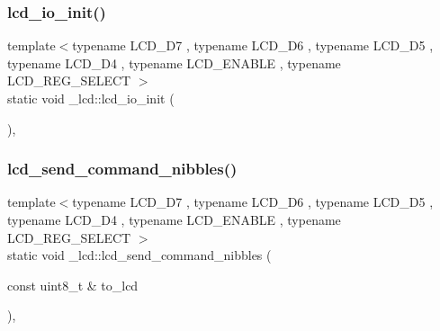 \subsubsection{\texorpdfstring{lcd\+\_\+io\+\_\+init()}{lcd\_io\_init()}}
{\footnotesize\ttfamily template$<$typename L\+C\+D\+\_\+\+D7 , typename L\+C\+D\+\_\+\+D6 , typename L\+C\+D\+\_\+\+D5 , typename L\+C\+D\+\_\+\+D4 , typename L\+C\+D\+\_\+\+E\+N\+A\+B\+LE , typename L\+C\+D\+\_\+\+R\+E\+G\+\_\+\+S\+E\+L\+E\+CT $>$ \\
static void \+\_\+lcd\+::lcd\+\_\+io\+\_\+init (\begin{DoxyParamCaption}{ }\end{DoxyParamCaption})\hspace{0.3cm}{\ttfamily [inline]}, {\ttfamily [static]}}

\hypertarget{namespace__lcd_a19b7494e20f4704c3272876e70acf095}{}\label{namespace__lcd_a19b7494e20f4704c3272876e70acf095} 
\subsubsection{\texorpdfstring{lcd\+\_\+send\+\_\+command\+\_\+nibbles()}{lcd\_send\_command\_nibbles()}}
{\footnotesize\ttfamily template$<$typename L\+C\+D\+\_\+\+D7 , typename L\+C\+D\+\_\+\+D6 , typename L\+C\+D\+\_\+\+D5 , typename L\+C\+D\+\_\+\+D4 , typename L\+C\+D\+\_\+\+E\+N\+A\+B\+LE , typename L\+C\+D\+\_\+\+R\+E\+G\+\_\+\+S\+E\+L\+E\+CT $>$ \\
static void \+\_\+lcd\+::lcd\+\_\+send\+\_\+command\+\_\+nibbles (\begin{DoxyParamCaption}\item[{const uint8\+\_\+t \&}]{to\+\_\+lcd }\end{DoxyParamCaption})\hspace{0.3cm}{\ttfamily [inline]}, {\ttfamily [static]}}

\hypertarget{namespace__lcd_aee51ff72fcb02d50a39e33820a950a45}{}\label{namespace__lcd_aee51ff72fcb02d50a39e33820a950a45} 
